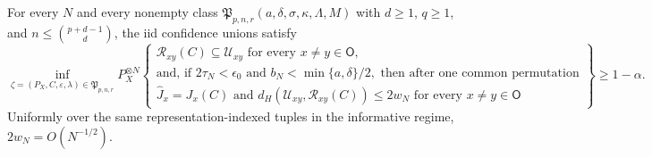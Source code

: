 For every \(N\) and every nonempty class \(\mathfrak P_{p,n,r}(a,\delta,\sigma,\kappa,\Lambda,M)\) with \(d\ge1\), \(q\ge1\), and \(n\le\binom{p+d-1}{d}\), the iid confidence unions satisfy \[\inf_{\zeta=(P_X,C,\varepsilon,\lambda)\in\mathfrak P_{p,n,r}}P_X^{\otimes N}\!\left\{\begin{array}{l}\mathcal R_{xy}(C)\subseteq\mathcal U_{xy}\text{ for every }x\ne y\in\mathsf O,\\ \text{and, if }2\tau_N<\epsilon_0\text{ and }b_N<\min\{a,\delta\}/2,\text{ then after one common permutation}\\ \widehat J_x=J_x(C)\text{ and }d_H(\mathcal U_{xy},\mathcal R_{xy}(C))\le2w_N\text{ for every }x\ne y\in\mathsf O\end{array}\right\}\ge1-\alpha.\] Uniformly over the same representation-indexed tuples in the informative regime, \(2w_N=O(N^{-1/2})\).